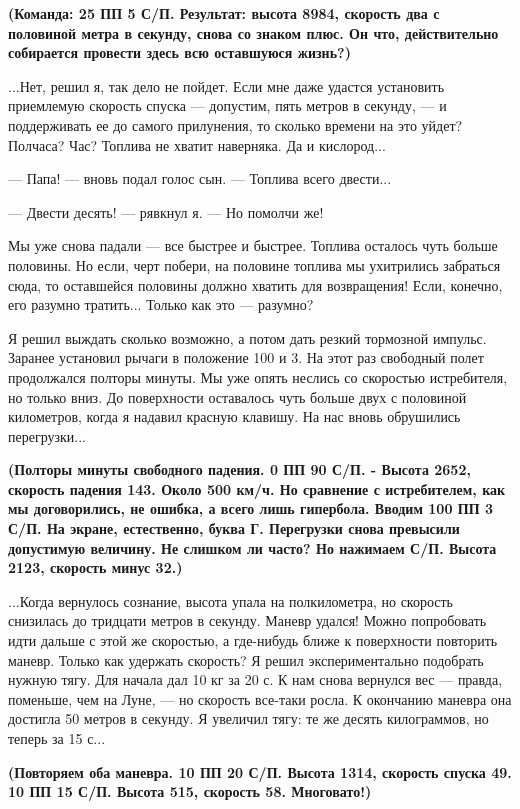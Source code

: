 \documentclass[11pt,a4paper,oneside]{article}
\begin{document}
\textbf{
(Команда: 25 ПП 5 С/П. Результат: высота 8984, скорость два с половиной метра в секунду, снова со знаком плюс. Он что, действительно собирается провести здесь всю оставшуюся жизнь?)}

...Нет, решил я, так дело не пойдет. Если мне даже удастся установить приемлемую скорость спуска — допустим, пять метров в секунду, — и поддерживать ее до самого прилунения, то сколько времени на это уйдет? Полчаса? Час? Топлива не хватит наверняка. Да и кислород...

— Папа! — вновь подал голос сын. — Топлива всего двести...

— Двести десять! — рявкнул я. — Но помолчи же!

Мы уже снова падали — все быстрее и быстрее. Топлива осталось чуть больше половины. Но если, черт побери, на половине топлива мы ухитрились забраться сюда, то оставшейся половины должно хватить для возвращения! Если, конечно, его разумно тратить... Только как это — разумно?

Я решил выждать сколько возможно, а потом дать резкий тормозной импульс. Заранее установил рычаги в положение 100 и 3. На этот раз свободный полет продолжался полторы минуты. Мы уже опять неслись со скоростью истребителя, но только вниз. До поверхности оставалось чуть больше двух с половиной километров, когда я надавил красную клавишу. На нас вновь обрушились перегрузки...

\textbf{
(Полторы минуты свободного падения. 0 ПП 90 С/П. - Высота 2652, скорость падения 143. Около 500 км/ч. Но сравнение с истребителем, как мы договорились, не ошибка, а всего лишь гипербола. Вводим 100 ПП 3 С/П. На экране, естественно, буква Г. Перегрузки снова превысили допустимую величину. Не слишком ли часто? Но нажимаем С/П. Высота 2123, скорость минус 32.)}

...Когда вернулось сознание, высота упала на полкилометра, но скорость снизилась до тридцати метров в секунду. Маневр удался! Можно попробовать идти дальше с этой же скоростью, а где-нибудь ближе к поверхности повторить маневр. Только как удержать скорость? Я решил экспериментально подобрать нужную тягу. Для начала дал 10 кг за 20 с. К нам снова вернулся вес — правда, поменьше, чем на Луне, — но скорость все-таки росла. К окончанию маневра она достигла 50 метров в секунду. Я увеличил тягу: те же десять килограммов, но теперь за 15 с...

\textbf{
(Повторяем оба маневра. 10 ПП 20 С/П. Высота 1314, скорость спуска 49. 10 ПП 15 С/П. Высота 515, скорость 58. Многовато!)}
\end{document}
